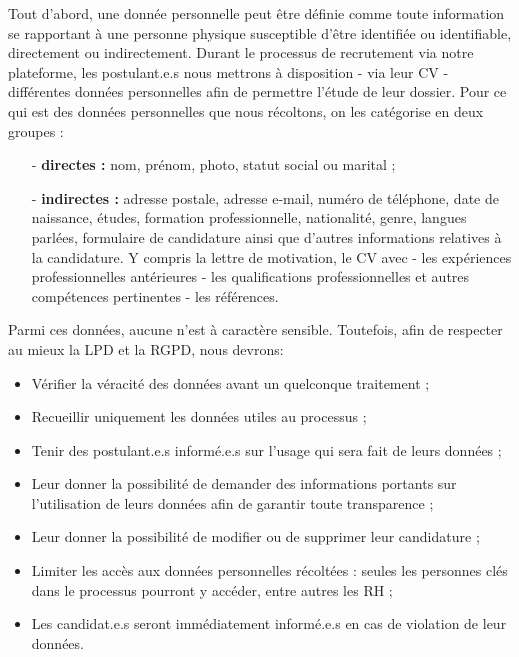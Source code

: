Tout d'abord, une donnée personnelle peut être définie comme toute information se rapportant à une personne physique susceptible d'être identifiée ou identifiable, directement ou indirectement.  Durant le processus de recrutement via notre plateforme, les postulant.e.s nous mettrons à disposition - via leur CV - différentes données personnelles afin de permettre l'étude de leur dossier. Pour ce qui est des données personnelles que nous récoltons, on les catégorise en deux groupes :\newline

\begin{enumerate}
\item[-] \textbf{directes :} nom, prénom, photo, statut social ou marital ; \\
\item[-] \textbf{indirectes :} adresse postale, adresse e-mail, numéro de téléphone, date de naissance, études, formation professionnelle, nationalité, genre, langues parlées, formulaire de candidature ainsi que d'autres informations relatives à la candidature. Y compris la lettre de motivation, le CV avec - les expériences professionnelles antérieures - les qualifications professionnelles et autres compétences pertinentes - les références.\\
\end{enumerate}

Parmi ces données, aucune n'est à caractère sensible. Toutefois, afin de respecter au mieux la LPD et la RGPD, nous devrons:\newline

\begin{itemize}
    \item Vérifier la véracité des données avant un quelconque traitement ;\\
    \item Recueillir uniquement les données utiles au processus ;\\
    \item Tenir des postulant.e.s informé.e.s sur l'usage qui sera fait de leurs données ;\\
    \item Leur donner la possibilité de demander des informations portants sur l'utilisation de leurs données afin de garantir toute transparence ;\\
    \item Leur donner la possibilité de modifier ou de supprimer leur candidature ;\\
    \item Limiter les accès aux données personnelles récoltées : seules les personnes clés dans le processus pourront y accéder, entre autres les RH ;\\
    \item Les candidat.e.s seront immédiatement informé.e.s en cas de violation de leur données. \\
\end{itemize}

